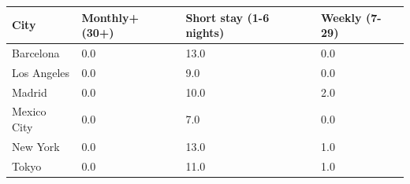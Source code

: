 \begin{tabular}{llll}
\toprule
City & Monthly+ (30+) & Short stay (1-6 nights) & Weekly (7-29) \\
\midrule
Barcelona & 0.0 & 13.0 & 0.0 \\
Los Angeles & 0.0 & 9.0 & 0.0 \\
Madrid & 0.0 & 10.0 & 2.0 \\
Mexico City & 0.0 & 7.0 & 0.0 \\
New York & 0.0 & 13.0 & 1.0 \\
Tokyo & 0.0 & 11.0 & 1.0 \\
\bottomrule
\end{tabular}
